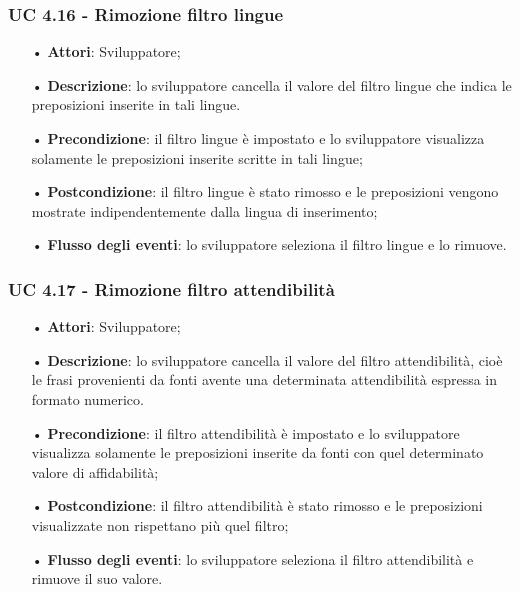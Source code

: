 \subsubsection{UC 4.16 - Rimozione filtro lingue}
\begin{itemize}
	\item[•]\textbf{Attori}: Sviluppatore;
	\item[•]\textbf{Descrizione}: lo sviluppatore cancella il valore del filtro lingue che indica le preposizioni inserite in tali lingue.
	\item[•]\textbf{Precondizione}: il filtro lingue è impostato e lo sviluppatore visualizza solamente le preposizioni inserite scritte in tali lingue;
	\item[•]\textbf{Postcondizione}: il filtro lingue è stato rimosso e le preposizioni vengono mostrate indipendentemente dalla lingua di inserimento;
	\item[•]\textbf{Flusso degli eventi}: lo sviluppatore seleziona il filtro lingue e lo rimuove.
\end{itemize}

\subsubsection{UC 4.17 - Rimozione filtro attendibilità}
\begin{itemize}
	\item[•]\textbf{Attori}: Sviluppatore;
	\item[•]\textbf{Descrizione}: lo sviluppatore cancella il valore del filtro attendibilità, cioè le frasi provenienti da fonti avente una determinata attendibilità espressa in formato numerico.
	\item[•]\textbf{Precondizione}: il filtro attendibilità è impostato e lo sviluppatore visualizza solamente le preposizioni inserite da fonti con quel determinato valore di affidabilità;
	\item[•]\textbf{Postcondizione}: il filtro attendibilità è stato rimosso e le preposizioni visualizzate non rispettano più quel filtro;
	\item[•]\textbf{Flusso degli eventi}: lo sviluppatore seleziona il filtro attendibilità e rimuove il suo valore.
\end{itemize}